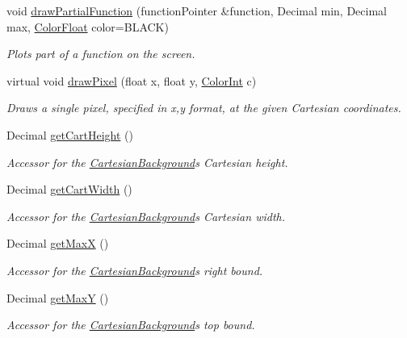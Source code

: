 \begin{DoxyCompactItemize}
void \hyperlink{classtsgl_1_1_cartesian_background_a315ee79b872d8fc612749795f4bbb6d9}{draw\+Partial\+Function} (function\+Pointer \&function, Decimal min, Decimal max, \hyperlink{structtsgl_1_1_color_float}{Color\+Float} color=B\+L\+A\+CK)
\begin{DoxyCompactList}\small\item\em Plots part of a function on the screen. \end{DoxyCompactList}\item 
virtual void \hyperlink{classtsgl_1_1_cartesian_background_a3a5a05134a9cfd0569efe2fd66d30e6a}{draw\+Pixel} (float x, float y, \hyperlink{structtsgl_1_1_color_int}{Color\+Int} c)
\begin{DoxyCompactList}\small\item\em Draws a single pixel, specified in x,y format, at the given Cartesian coordinates. \end{DoxyCompactList}\item 
Decimal \hyperlink{classtsgl_1_1_cartesian_background_a93d3f5f05ad533a5ec1f896477182aff}{get\+Cart\+Height} ()
\begin{DoxyCompactList}\small\item\em Accessor for the \hyperlink{classtsgl_1_1_cartesian_background}{Cartesian\+Background}\textquotesingle{}s Cartesian height. \end{DoxyCompactList}\item 
Decimal \hyperlink{classtsgl_1_1_cartesian_background_a7bede4180193c61fcaf01c9f3cc6aca1}{get\+Cart\+Width} ()
\begin{DoxyCompactList}\small\item\em Accessor for the \hyperlink{classtsgl_1_1_cartesian_background}{Cartesian\+Background}\textquotesingle{}s Cartesian width. \end{DoxyCompactList}\item 
Decimal \hyperlink{classtsgl_1_1_cartesian_background_af8131853b72c0ff370b1b558bf2c8073}{get\+MaxX} ()
\begin{DoxyCompactList}\small\item\em Accessor for the \hyperlink{classtsgl_1_1_cartesian_background}{Cartesian\+Background}\textquotesingle{}s right bound. \end{DoxyCompactList}\item 
Decimal \hyperlink{classtsgl_1_1_cartesian_background_a6f0d1852411eae2fe0a2822a6da29d7d}{get\+MaxY} ()
\begin{DoxyCompactList}\small\item\em Accessor for the \hyperlink{classtsgl_1_1_cartesian_background}{Cartesian\+Background}\textquotesingle{}s top bound. \end{DoxyCompactList}\item 

\end{DoxyCompactItemize}
